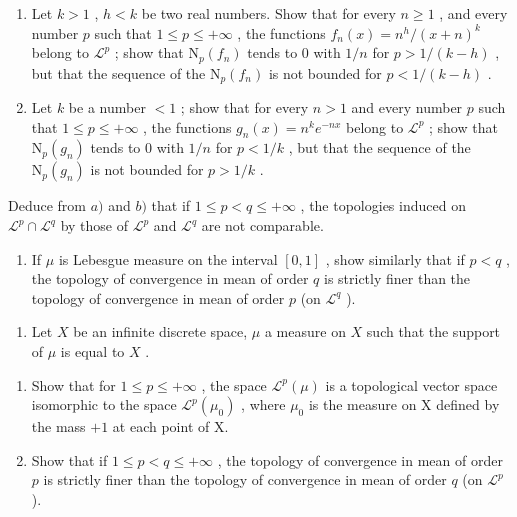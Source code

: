 \begin{enumerate}
\def\labelenumi{\alph{enumi})}
\item
  Let \(k > 1\) , \(h < k\) be two real numbers. Show that for every \(n \geqslant 1\) , and every number \(p\) such that \(1 \leqslant p \leqslant +\infty\) , the functions \(f_n(x) = n^h / (x + n)^k\) belong to \(\mathcal{L}^p\) ; show that \(\mathrm{N}_p(f_n)\) tends to 0 with \(1/n\) for \(p > 1 / (k - h)\) , but that the sequence of the \(\mathrm{N}_p(f_n)\) is not bounded for \(p < 1 / (k - h)\) .
\item
  Let \(k\) be a number \(< 1\) ; show that for every \(n > 1\) and every number \(p\) such that \(1 \leqslant p \leqslant +\infty\) , the functions \(g_n(x) = n^k e^{-nx}\) belong to \(\mathcal{L}^p\) ; show that \(\mathrm{N}_p(g_n)\) tends to 0 with \(1/n\) for \(p < 1/k\) , but that the sequence of the \(\mathrm{N}_p(g_n)\) is not bounded for \(p > 1/k\) .
\end{enumerate}

Deduce from \(a)\) and \(b)\) that if \(1 \leqslant p < q \leqslant +\infty\) , the topologies induced on \(\mathcal{L}^p \cap \mathcal{L}^q\) by those of \(\mathcal{L}^p\) and \(\mathcal{L}^q\) are not comparable.

\begin{enumerate}
\def\labelenumi{\alph{enumi})}
\setcounter{enumi}{2}
\tightlist
\item
  If \(\mu\) is Lebesgue measure on the interval \([0,1]\) , show similarly that if \(p < q\) , the topology of convergence in mean of order \(q\) is strictly finer than the topology of convergence in mean of order \(p\) (on \(\mathcal{L}^q\) ).
\end{enumerate}

\begin{enumerate}
\def\labelenumi{\arabic{enumi})}
\setcounter{enumi}{8}
\tightlist
\item
  Let \(X\) be an infinite discrete space, \(\mu\) a measure on \(X\) such that the support of \(\mu\) is equal to \(X\) .
\end{enumerate}

\begin{enumerate}
\def\labelenumi{\alph{enumi})}
\item
  Show that for \(1 \leqslant p \leqslant +\infty\) , the space \(\mathcal{L}^p(\mu)\) is a topological vector space isomorphic to the space \(\mathcal{L}^p(\mu_0)\) , where \(\mu_0\) is the measure on X defined by the mass \(+1\) at each point of X.
\item
  Show that if \(1 \leqslant p < q \leqslant +\infty\) , the topology of convergence in mean of order \(p\) is strictly finer than the topology of convergence in mean of order \(q\) (on \(\mathcal{L}^p\) ).
\end{enumerate}

